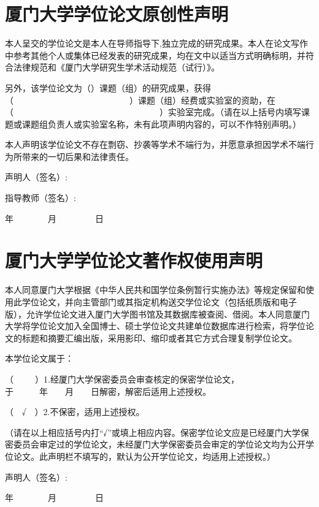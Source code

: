 \pagestyle{empty}
%
\section*{\centering\heiti {}厦门大学学位论文原创性声明}
\vspace{21pt}
 \par {}
 本人呈交的学位论文是本人在导师指导下,独立完成的研究成果。本人在论文写作中参考其他个人或集体已经发表的研究成果，均在文中以适当方式明确标明，并符合法律规范和《厦门大学研究生学术活动规范（试行）》。
 \par
 另外，该学位论文为（\hspace{12em}）课题（组）的研究成果，获得（~~~~~~~~~~~~~~~~~~~~~~~~~~~）课题（组）经费或实验室的资助，在（~~~~~~~~~~~~~~~~~~~~~~~~~~~~~~~~~~）实验室完成。（请在以上括号内填写课题或课题组负责人或实验室名称，未有此项声明内容的，可以不作特别声明。）
 \par
 本人声明该学位论文不存在剽窃、抄袭等学术不端行为，并愿意承担因学术不端行为所带来的一切后果和法律责任。
 \vspace{3ex}
 \par \hfill
 声明人（签名）:~~~~~~~~~~~~
\par \hfill
 指导教师（签名）:~~~~~~~~~~~~
 \par \hfill
 年~~~~~~~~月~~~~~~~~~日
 \clearpage\cleardoublepage

\section*{\centering\heiti {}厦门大学学位论文著作权使用声明}
\vspace*{21pt}
 \par
 本人同意厦门大学根据《中华人民共和国学位条例暂行实施办法》等规定保留和使用此学位论文，并向主管部门或其指定机构送交学位论文（包括纸质版和电子版），允许学位论文进入厦门大学图书馆及其数据库被查阅、借阅。本人同意厦门大学将学位论文加入全国博士、硕士学位论文共建单位数据库进行检索，将学位论文的标题和摘要汇编出版，采用影印、缩印或者其它方式合理复制学位论文。
 \par
 本学位论文属于：
 \par
 （~~~~~）1.经厦门大学保密委员会审查核定的保密学位论文，于~~~~~~年~~~~月~~~~日解密，解密后适用上述授权。
 \par
 （~~√~~）2.不保密，适用上述授权。
 \par
 （请在以上相应括号内打“√”或填上相应内容。保密学位论文应是已经厦门大学保密委员会审定过的学位论文，未经厦门大学保密委员会审定的学位论文均为公开学位论文。此声明栏不填写的，默认为公开学位论文，均适用上述授权。）
 \vspace{3ex}
 \par \hfill
 声明人（签名）:~~~~~~~~~~~~
 \par \hfill
 年~~~~~~~~月~~~~~~~~~日

